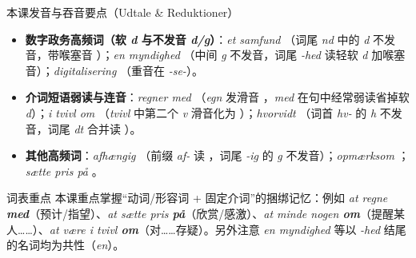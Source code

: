 \begin{tipbox}{本课发音与吞音要点（Udtale \& Reduktioner）}
\begin{itemize}
  \item \textbf{数字政务高频词（软 \textit{d} 与不发音 \textit{d/g}）}：\textit{et samfund} （词尾 \textit{nd} 中的 \textit{d} 不发音，带喉塞音 ）；\textit{en myndighed} （中间 \textit{g} 不发音，词尾 \textit{-hed} 读轻软 \textit{d} 加喉塞音）；\textit{digitalisering} （重音在 \textit{-se-}）。
  \item \textbf{介词短语弱读与连音}：\textit{regner med} （\textit{egn} 发滑音 ，\textit{med} 在句中经常弱读省掉软 \textit{d}）；\textit{i tvivl om} （\textit{tvivl} 中第二个 \textit{v} 滑音化为 ）；\textit{hvorvidt} （词首 \textit{hv-} 的 \textit{h} 不发音，词尾 \textit{dt} 合并读 ）。
  \item \textbf{其他高频词}：\textit{afhængig} （前缀 \textit{af-} 读 ，词尾 \textit{-ig} 的 \textit{g} 不发音）；\textit{opmærksom} ；\textit{sætte pris på} 。
\end{itemize}
\end{tipbox}


\begin{tipbox}{词表重点}
本课重点掌握“动词/形容词 + 固定介词”的捆绑记忆：例如 \textit{at regne \textbf{med}}（预计/指望）、\textit{at sætte pris \textbf{på}}（欣赏/感激）、\textit{at minde nogen \textbf{om}}（提醒某人……）、\textit{at være i tvivl \textbf{om}}（对……存疑）。另外注意 \textit{en myndighed} 等以 \textit{-hed} 结尾的名词均为共性（\textit{en}）。
\end{tipbox}

